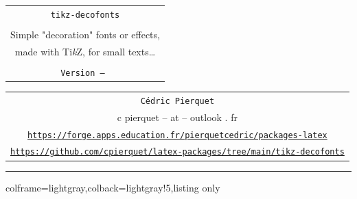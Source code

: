 \documentclass[11pt,a4paper]{ltxdoc}
\begin{document}
\thispagestyle{empty}

\begin{center}
	\begin{minipage}{0.88\linewidth}
		\begin{tcolorbox}[colframe=yellow,colback=yellow!15]
			\begin{center}
				\renewcommand{\arraystretch}{1.25}%
				\begin{tabular}{c}
					{\Huge \texttt{tikz-decofonts}}\\
					\\
					{\LARGE Simple "decoration" fonts or effects,} \\
					{\LARGE made with Ti\textit{k}Z, for small texts\ldots} \\
					\\
					{\small \texttt{Version \tkzdfversion{} -- \tkzdfdate}}
				\end{tabular}
			\end{center}
		\end{tcolorbox}
	\end{minipage}
\end{center}

\begin{center}
	\begin{tabular}{c}
		\texttt{Cédric Pierquet}\\
		{\ttfamily c pierquet -- at -- outlook . fr}\\
		\texttt{\url{https://forge.apps.education.fr/pierquetcedric/packages-latex}} \\
		\texttt{\url{https://github.com/cpierquet/latex-packages/tree/main/tikz-decofonts}} \\
	\end{tabular}
\end{center}

\hrule

\vfill

\begin{tcblisting}{colframe=lightgray,colback=lightgray!5,listing only}
\end{tcblisting}
\end{document}
